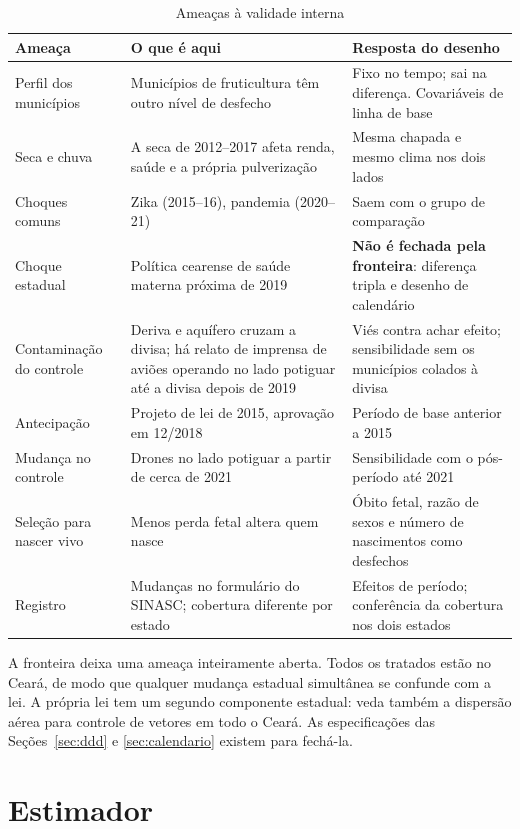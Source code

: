 \begin{table}[ht]
\centering\small
\caption{Ameaças à validade interna}
\label{tab:ameacas}
\begin{tabularx}{\textwidth}{@{}p{3.1cm}LL@{}}
\toprule
Ameaça & O que é aqui & Resposta do desenho \\
\midrule
Perfil dos municípios & Municípios de fruticultura têm outro nível de desfecho & Fixo no tempo; sai na diferença. Covariáveis de linha de base \\
Seca e chuva & A seca de 2012--2017 afeta renda, saúde e a própria pulverização & Mesma chapada e mesmo clima nos dois lados \\
Choques comuns & Zika (2015--16), pandemia (2020--21) & Saem com o grupo de comparação \\
Choque estadual & Política cearense de saúde materna próxima de 2019 & \textbf{Não é fechada pela fronteira}: diferença tripla e desenho de calendário \\
Contaminação do controle & Deriva e aquífero cruzam a divisa; há relato de imprensa de aviões operando no lado potiguar até a divisa depois de 2019 & Viés contra achar efeito; sensibilidade sem os municípios colados à divisa \\
Antecipação & Projeto de lei de 2015, aprovação em 12/2018 & Período de base anterior a 2015 \\
Mudança no controle & Drones no lado potiguar a partir de cerca de 2021 & Sensibilidade com o pós-período até 2021 \\
Seleção para nascer vivo & Menos perda fetal altera quem nasce & Óbito fetal, razão de sexos e número de nascimentos como desfechos \\
Registro & Mudanças no formulário do SINASC; cobertura diferente por estado & Efeitos de período; conferência da cobertura nos dois estados \\
\bottomrule
\end{tabularx}
\end{table}

A fronteira deixa uma ameaça inteiramente aberta. Todos os tratados estão
no Ceará, de modo que qualquer mudança estadual simultânea se confunde com a
lei. A própria lei tem um segundo componente estadual: veda também a dispersão
aérea para controle de vetores em todo o Ceará. As especificações das Seções~\ref{sec:ddd} e \ref{sec:calendario} existem
para fechá-la.

\section{Estimador}

